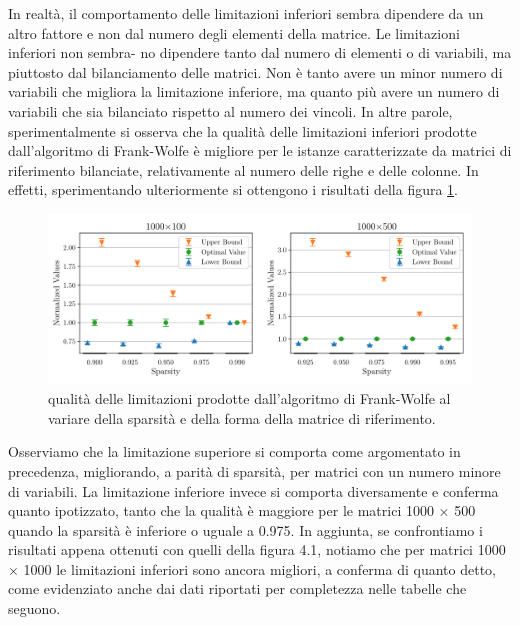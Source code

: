 In realtà, il comportamento delle limitazioni inferiori sembra dipendere da un altro fattore e non dal numero degli
elementi della matrice. Le limitazioni inferiori non sembra- no dipendere tanto dal numero di elementi o di variabili,
ma piuttosto dal bilanciamento delle matrici. Non è tanto avere un minor numero di variabili che migliora la limitazione
inferiore, ma quanto più avere un numero di variabili che sia bilanciato rispetto al numero dei vincoli. In altre
parole, sperimentalmente si osserva che la qualità delle limitazioni inferiori prodotte dall’algoritmo di Frank-Wolfe è
migliore per le istanze caratterizzate da matrici di riferimento bilanciate, relativamente al numero delle righe e delle
colonne. In effetti, sperimentando ulteriormente si ottengono i risultati della figura \ref{fig:morevars}.


\begin{figure}[ht]
    \centering
    \includegraphics[width=\textwidth]{assets/figures/shape_more_vars.pdf}
    \caption{qualità delle limitazioni prodotte dall'algoritmo di Frank-Wolfe al variare della sparsità e della forma
    della matrice di riferimento.}
    \label{fig:morevars}
\end{figure}

\noindent
Osserviamo che la limitazione superiore si comporta come argomentato in precedenza, migliorando, a parità di sparsità,
per matrici con un numero minore di variabili. La limitazione inferiore invece si comporta diversamente e conferma
quanto ipotizzato, tanto che la qualità è maggiore per le matrici 1000 × 500 quando la sparsità è inferiore o uguale a
0.975. In aggiunta, se confrontiamo i risultati appena ottenuti con quelli della figura 4.1, notiamo che per matrici
1000 × 1000 le limitazioni inferiori sono ancora migliori, a conferma di quanto detto, come evidenziato anche dai dati
riportati per completezza nelle tabelle che seguono.

